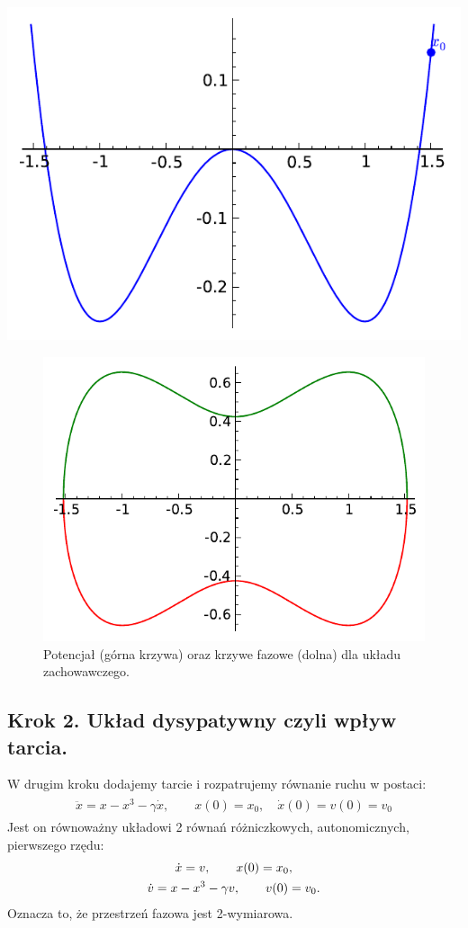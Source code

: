 \documentclass[a4paper,12pt,polish]{sphinxmanual}
\begin{document}
{\hfill\includegraphics[width=0.500\linewidth]{sage_chII011_02a.pdf}\hfill}
\begin{figure}[htbp]
\centering
\capstart

\includegraphics[width=0.500\linewidth]{sage_chII011_02b.pdf}
\caption{Potencjał (górna krzywa) oraz krzywe fazowe (dolna)
dla układu zachowawczego.}\end{figure}


\subsection{Krok 2. Układ dysypatywny czyli wpływ tarcia.}
\label{ch2/chII011:krok-2-uklad-dysypatywny-czyli-wplyw-tarcia}
W drugim  kroku dodajemy tarcie i rozpatrujemy równanie ruchu w postaci:
\label{ch2/chII011:equation-eqn12}\begin{gather}
\begin{split}\ddot x =  x - x^3 -\gamma \dot x , \qquad x(0) = x_0, \quad  \dot x(0) = v(0) =  v_0\end{split}\label{ch2/chII011-eqn12}
\end{gather}
Jest on równoważny układowi 2 równań różniczkowych, autonomicznych, pierwszego rzędu:
\label{ch2/chII011:equation-eqn13}\begin{gather}
\begin{split}\dot x = v, \qquad x(0) = x_0,\end{split}\label{ch2/chII011-eqn13}\\\begin{split}\dot v = x - x^3 -\gamma v , \qquad v(0) = v_0.\end{split}\notag
\end{gather}
Oznacza to, że przestrzeń fazowa jest 2-wymiarowa.
\end{document}
